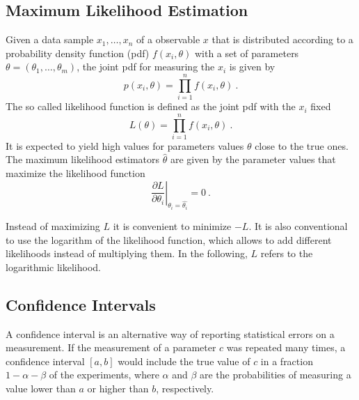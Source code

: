 \subsection{Maximum Likelihood Estimation}
\label{subsec:maxlikeest}
Given a data sample $x_1,\dots,x_n$ of a observable $x$ that is distributed according to a probability density function (pdf) $f(x_i,\theta)$ with a set of parameters $\theta=(\theta_1,\dots,\theta_m)$, the joint pdf for measuring the $x_i$ is given by \cite{cowan}
\begin{equation}
p(x_i,\theta) = \prod_{i=1}^n f(x_i,\theta) ~.
\end{equation}
The so called likelihood function is defined as the joint pdf with the $x_i$ fixed
\begin{equation}
L(\theta) = \prod_{i=1}^n f(x_i,\theta) ~.
\end{equation}
It is expected to yield high values for parameters values $\theta$ close to the true ones. The maximum likelihood estimators $\hat{\theta}$ are given by the parameter values that maximize the likelihood function
\begin{equation}
\left. \frac{\partial L}{\partial \theta_i} \right| _{\theta_i=\hat{\theta_i}} = 0 ~.
\label{eq:limits:1stderivlikelihood}
\end{equation}

Instead of maximizing $L$ it is convenient to minimize $-L$. It is also conventional to use the logarithm of the likelihood function, which allows to add different likelihoods instead of multiplying them. In the following, $L$ refers to the logarithmic likelihood.

\subsection{Confidence Intervals}
A confidence interval is an alternative way of reporting statistical errors on a measurement. If the measurement of a parameter $c$ was repeated many times, a confidence interval $[a,b]$ would include the true value of $c$ in a fraction $1-\alpha-\beta$ of the experiments, where $\alpha$ and $\beta$ are the probabilities of measuring a value lower than $a$ or higher than $b$, respectively.\\

